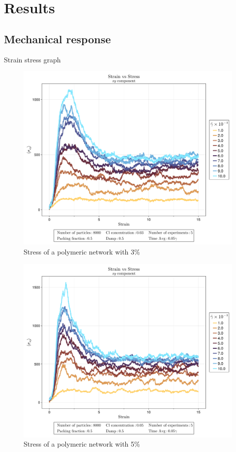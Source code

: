 \section{Results}

\subsection{Mechanical response}

Strain stress graph

\begin{figure}[ht!]
    \centering
    \includegraphics[width=\textwidth]{figs/ComputaitonalResults/CL3/StrainStressXY.png}
    \caption{Stress of a polymeric network with 3\%}
\end{figure}

\begin{figure}[ht!]
    \centering
    \includegraphics[width=\textwidth]{figs/ComputaitonalResults/CL5/StrainStressXY.png}
    \caption{Stress of a polymeric network with 5\%}
\end{figure}

